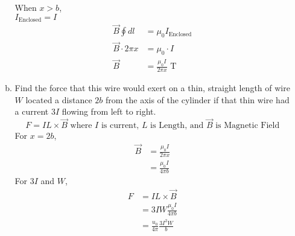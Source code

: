 \documentclass[fleqn]{article}
\begin{document}
\begin{enumerate}
\begin{enumerate}[a)]
					When $x>b$,\\
					$I_{\text{Enclosed}} = I$
					\begin{align*}
						\vec{B}\oint dl &= \mu_0I_{\text{Enclosed}}\\
						\vec{B}\cdot2\pi x &= \mu_0 \cdot I\\
						\vec{B} &= \frac{\mu_0 I}{2\pi x}\text{ T}
					\end{align*}
\pagebreak
				\item
					Find the force that this wire would exert on a thin, straight length of wire $W$ located a distance $2b$ from the axis of the cylinder if that thin wire had a current $3I$ flowing from left to right.\\
					$$F = IL\times \vec{B}\text{ where }I\text{ is current, }L\text{ is Length, and }\vec{B}\text{ is Magnetic Field}$$
					For $x = 2b$,
					\begin{align*}
						\vec{B} &= \frac{\mu_0 I}{2\pi x}\\
							     &= \frac{\mu_0I}{4\pi b}
					\end{align*}
					For $3I$ and $W$,
					\begin{align*}
						F &= IL\times \vec{B}\\
						   &= 3IW \frac{\mu_0I}{4\pi b}\\
						   &= \frac{u_0}{4\pi}\frac{3I^2W}{b}
					\end{align*}
			\end{enumerate}
	\end{enumerate}
\end{document}
